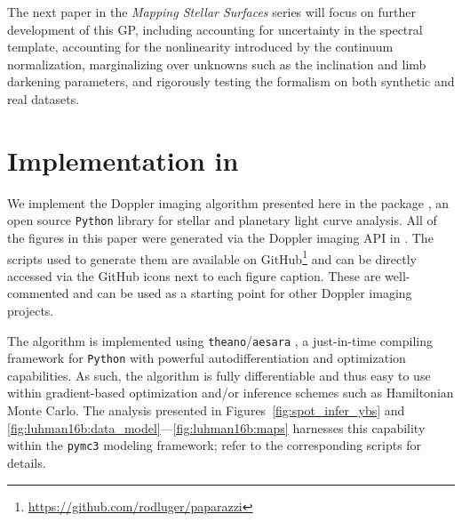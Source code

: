 \documentclass[modern]{aastex631}
\begin{document}
The next paper in the \emph{Mapping Stellar Surfaces} series will focus on further development of this GP, including accounting for uncertainty in the spectral template, accounting for the nonlinearity introduced by the continuum normalization, marginalizing over unknowns such as the inclination and limb darkening parameters, and rigorously testing the formalism on both synthetic and real datasets.

\section{Implementation in \starry}
\label{sec:starry}

We implement the Doppler imaging algorithm presented here in the \starry package \citep{Luger2019,Luger2021c}, an open source \texttt{Python} library for stellar and planetary light curve analysis. 
All of the figures in this paper were generated via the Doppler imaging API in \starry. 
The scripts used to generate them are available on GitHub\footnote{\url{https://github.com/rodluger/paparazzi}} and can be directly accessed via the GitHub icons next to each figure caption.
These are well-commented and can be used as a starting point for other Doppler imaging projects.

The algorithm is implemented using \texttt{theano}/\texttt{aesara} \citep{Bergstra2010,Willard2021}, a just-in-time compiling framework for \texttt{Python} with powerful autodifferentiation and optimization capabilities.
As such, the algorithm is fully differentiable and thus easy to use within gradient-based optimization and/or inference schemes such as Hamiltonian Monte Carlo.
The analysis presented in Figures~\ref{fig:spot_infer_ybs} and \ref{fig:luhman16b:data_model}---\ref{fig:luhman16b:maps} harnesses this capability within the \texttt{pymc3} modeling framework; refer to the corresponding scripts for details.
\end{document}

